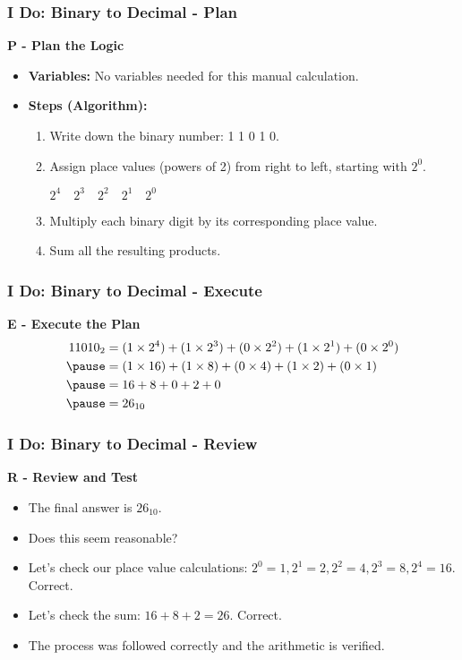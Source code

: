 \documentclass{beamer}
\begin{document}
\begin{frame}
\frametitle{I Do: Binary to Decimal - Plan}
\textbf{P - Plan the Logic}
\begin{itemize}
    \item \textbf{Variables:} No variables needed for this manual calculation.
    \item \textbf{Steps (Algorithm):}
    \begin{enumerate}
        \item Write down the binary number: 1 1 0 1 0.
        \item Assign place values (powers of 2) from right to left, starting with $2^0$.
        \begin{center}
        $2^4 \quad 2^3 \quad 2^2 \quad 2^1 \quad 2^0$
        \end{center}
        \item Multiply each binary digit by its corresponding place value.
        \item Sum all the resulting products.
    \end{enumerate}
\end{itemize}
\end{frame}

\begin{frame}
\frametitle{I Do: Binary to Decimal - Execute}
\textbf{E - Execute the Plan}
\begin{align*}
11010_2 &= (1 \times 2^4) + (1 \times 2^3) + (0 \times 2^2) + (1 \times 2^1) + (0 \times 2^0) \\
\pause
&= (1 \times 16) + (1 \times 8) + (0 \times 4) + (1 \times 2) + (0 \times 1) \\
\pause
&= 16 + 8 + 0 + 2 + 0 \\
\pause
&= 26_{10}
\end{align*}
\end{frame}

\begin{frame}
\frametitle{I Do: Binary to Decimal - Review}
\textbf{R - Review and Test}
\begin{itemize}
    \item The final answer is \alert{$26_{10}$}.
    \item Does this seem reasonable?
    \item Let's check our place value calculations: $2^0=1, 2^1=2, 2^2=4, 2^3=8, 2^4=16$. Correct.
    \item Let's check the sum: $16 + 8 + 2 = 26$. Correct.
    \item The process was followed correctly and the arithmetic is verified.
\end{itemize}
\end{frame}
\end{document}
